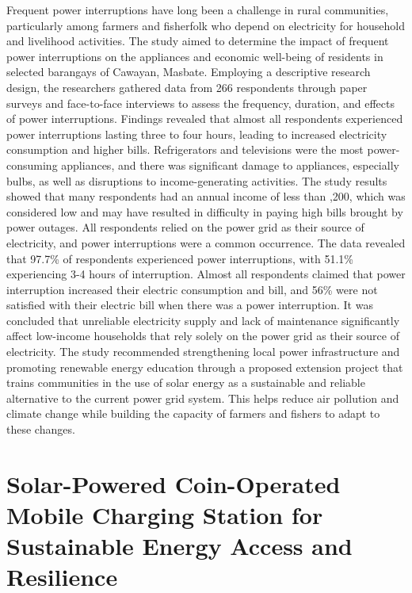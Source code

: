 {Frequent power interruptions have long been a challenge in rural communities, particularly among farmers and fisherfolk who depend on electricity for household and livelihood activities. The study aimed to determine the impact of frequent power interruptions on the appliances and economic well-being of residents in selected barangays of Cawayan, Masbate. Employing a descriptive research design, the researchers gathered data from 266 respondents through paper surveys and face-to-face interviews to assess the frequency, duration, and effects of power interruptions. Findings revealed that almost all respondents experienced power interruptions lasting three to four hours, leading to increased electricity consumption and higher bills. Refrigerators and televisions were the most power-consuming appliances, and there was significant damage to appliances, especially bulbs, as well as disruptions to income-generating activities. The study results showed that many respondents had an annual income of less than ,200, which was considered low and may have resulted in difficulty in paying high bills brought by power outages. All respondents relied on the power grid as their source of electricity, and power interruptions were a common occurrence. The data revealed that 97.7\% of respondents experienced power interruptions, with 51.1\% experiencing 3-4 hours of interruption. Almost all respondents claimed that power interruption increased their electric consumption and bill, and 56\% were not satisfied with their electric bill when there was a power interruption. It was concluded that unreliable electricity supply and lack of maintenance significantly affect low-income households that rely solely on the power grid as their source of electricity. The study recommended strengthening local power infrastructure and promoting renewable energy education through a proposed extension project that trains communities in the use of solar energy as a sustainable and reliable alternative to the current power grid system. This helps reduce air pollution and climate change while building the capacity of farmers and fishers to adapt to these changes.

\section{Solar-Powered Coin-Operated Mobile Charging Station for Sustainable Energy Access and Resilience}

}
